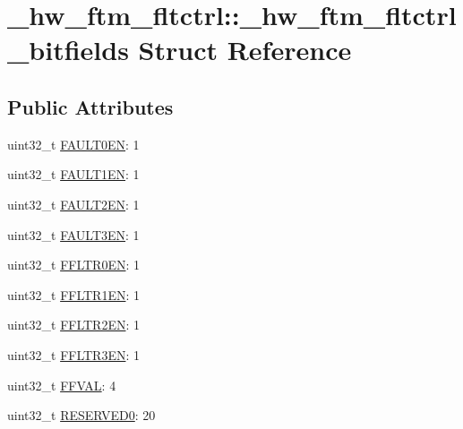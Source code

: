 \hypertarget{struct__hw__ftm__fltctrl_1_1__hw__ftm__fltctrl__bitfields}{}\section{\+\_\+hw\+\_\+ftm\+\_\+fltctrl\+:\+:\+\_\+hw\+\_\+ftm\+\_\+fltctrl\+\_\+bitfields Struct Reference}
\label{struct__hw__ftm__fltctrl_1_1__hw__ftm__fltctrl__bitfields}
\subsection*{Public Attributes}
\begin{DoxyCompactItemize}
\item 
uint32\+\_\+t \hyperlink{struct__hw__ftm__fltctrl_1_1__hw__ftm__fltctrl__bitfields_a871fc587bdc1da2025f8ce93826203c9}{F\+A\+U\+L\+T0\+EN}\+: 1
\item 
uint32\+\_\+t \hyperlink{struct__hw__ftm__fltctrl_1_1__hw__ftm__fltctrl__bitfields_aca34694e577528f133fec713146b5c67}{F\+A\+U\+L\+T1\+EN}\+: 1
\item 
uint32\+\_\+t \hyperlink{struct__hw__ftm__fltctrl_1_1__hw__ftm__fltctrl__bitfields_a805913f04a51e1fb426b832607ef8d6b}{F\+A\+U\+L\+T2\+EN}\+: 1
\item 
uint32\+\_\+t \hyperlink{struct__hw__ftm__fltctrl_1_1__hw__ftm__fltctrl__bitfields_aefa31af90fa319abbe550ca23ec05fd1}{F\+A\+U\+L\+T3\+EN}\+: 1
\item 
uint32\+\_\+t \hyperlink{struct__hw__ftm__fltctrl_1_1__hw__ftm__fltctrl__bitfields_ac5300850796a4d55600d916c3f43c33d}{F\+F\+L\+T\+R0\+EN}\+: 1
\item 
uint32\+\_\+t \hyperlink{struct__hw__ftm__fltctrl_1_1__hw__ftm__fltctrl__bitfields_a3c20308f9565a6dcc88ae685af1d2c73}{F\+F\+L\+T\+R1\+EN}\+: 1
\item 
uint32\+\_\+t \hyperlink{struct__hw__ftm__fltctrl_1_1__hw__ftm__fltctrl__bitfields_a997078fdf7951e62d56e776e241a55ff}{F\+F\+L\+T\+R2\+EN}\+: 1
\item 
uint32\+\_\+t \hyperlink{struct__hw__ftm__fltctrl_1_1__hw__ftm__fltctrl__bitfields_a00618c1c8a093d3c33310f81c94496a4}{F\+F\+L\+T\+R3\+EN}\+: 1
\item 
uint32\+\_\+t \hyperlink{struct__hw__ftm__fltctrl_1_1__hw__ftm__fltctrl__bitfields_a3961fe405148b2f7569d074cfdefa1dc}{F\+F\+V\+AL}\+: 4
\item 
uint32\+\_\+t \hyperlink{struct__hw__ftm__fltctrl_1_1__hw__ftm__fltctrl__bitfields_a80f6f4bc0c60308a0d8146057b2cdb0c}{R\+E\+S\+E\+R\+V\+E\+D0}\+: 20
\end{DoxyCompactItemize}


